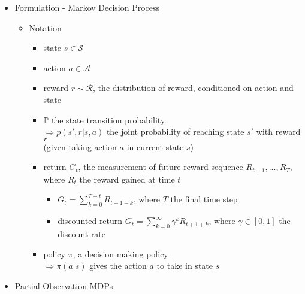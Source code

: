 \begin{itemize}
\item Formulation - Markov Decision Process
	\begin{itemize}
	\item Notation
		\begin{itemize}
		\item state $s \in \mathcal S$ 
		\item action $a \in \mathcal A$ 
		\item reward $r \sim \mathcal R$, the distribution of reward, conditioned on action and state
		\item $\mathbb P$ the state transition probability \\
		$\Rightarrow p(s',r|s,a)$ the joint probability of reaching state $s'$ with reward $r$ \\
		(given taking action $a$ in current state $s$) \\
		\item return $G_t$, the measurement of future reward sequence $R_{t+1},...,R_T$, \\
		where $R_t$ the reward gained at time $t$
			\begin{itemize}
			\item $G_t = \sum_{k=0}^{T-t} R_{t+1+k}$, where $T$ the final time step
			\item discounted return $G_t = \sum_{k=0}^\infty \gamma^k R_{t+1+k}$, where $\gamma\in[0,1]$ the discount rate
			\end{itemize}
		\item policy $\pi$, a decision making policy \\
		$\Rightarrow \pi (a|s)$ gives the action $a$ to take in state $s$
		\end{itemize}
	\end{itemize}

\item Partial Observation MDPs

\end{itemize}

